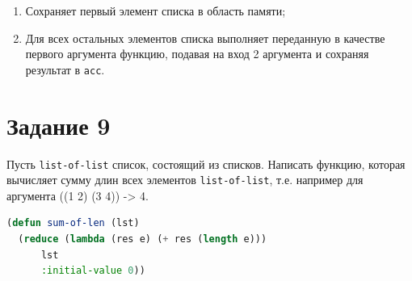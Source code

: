 \documentclass[12pt]{report}
\begin{document}
\begin{enumerate}
	\item Сохраняет первый элемент списка в область памяти;
	\item Для всех остальных элементов списка выполняет переданную в качестве первого аргумента функцию, подавая на вход 2 аргумента и сохраняя результат в \texttt{acc}.
\end{enumerate}




\section*{Задание 9}
Пусть \texttt{list-of-list} список, состоящий из списков. Написать функцию, которая вычисляет сумму длин всех элементов \texttt{list-of-list}, т.е. например для аргумента ((1 2) (3 4)) -> 4.

\begin{lstlisting}[language=Lisp]
(defun sum-of-len (lst)
  (reduce (lambda (res e) (+ res (length e)))
	  lst
	  :initial-value 0))
\end{lstlisting}


	
	
\end{document}
